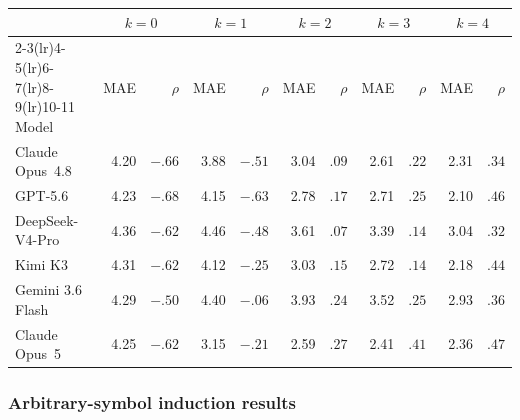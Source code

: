 \begin{center}
\begin{minipage}{\linewidth}
\centering
{}
\label{tab:coin-city-wrong-context}
\small
\setlength{\tabcolsep}{4pt}
\begin{tabular}{l rr rr rr rr rr}
\toprule
& \multicolumn{2}{c}{$k{=}0$} & \multicolumn{2}{c}{$k{=}1$} & \multicolumn{2}{c}{$k{=}2$}
& \multicolumn{2}{c}{$k{=}3$} & \multicolumn{2}{c}{$k{=}4$} \\
\cmidrule(lr){2-3}\cmidrule(lr){4-5}\cmidrule(lr){6-7}\cmidrule(lr){8-9}\cmidrule(lr){10-11}
Model & MAE & $\rho$ & MAE & $\rho$ & MAE & $\rho$ & MAE & $\rho$ & MAE & $\rho$ \\
\midrule
Claude Opus~4.8 & 4.20 & $-.66$ & 3.88 & $-.51$ & 3.04 & $.09$ & 2.61 & $.22$ & 2.31 & $.34$ \\
GPT-5.6 & 4.23 & $-.68$ & 4.15 & $-.63$ & 2.78 & $.17$ & 2.71 & $.25$ & 2.10 & $.46$ \\
DeepSeek-V4-Pro & 4.36 & $-.62$ & 4.46 & $-.48$ & 3.61 & $.07$ & 3.39 & $.14$ & 3.04 & $.32$ \\
Kimi K3 & 4.31 & $-.62$ & 4.12 & $-.25$ & 3.03 & $.15$ & 2.72 & $.14$ & 2.18 & $.44$ \\
Gemini 3.6 Flash & 4.29 & $-.50$ & 4.40 & $-.06$ & 3.93 & $.24$ & 3.52 & $.25$ & 2.93 & $.36$ \\
Claude Opus~5 & 4.25 & $-.62$ & 3.15 & $-.21$ & 2.59 & $.27$ & 2.41 & $.41$ & 2.36 & $.47$ \\
\bottomrule
\end{tabular}
\end{minipage}
\end{center}

\subsubsection{Arbitrary-symbol induction results}
\label{app:coin-city-symbol-context}

